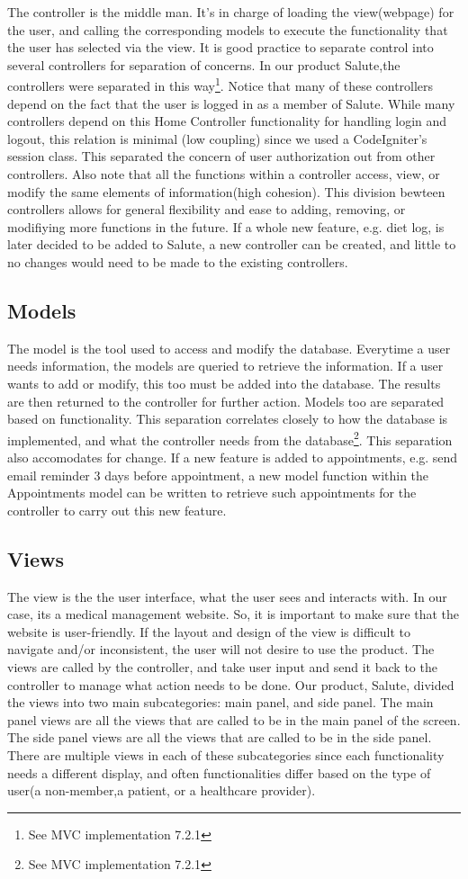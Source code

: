 \documentclass[12pt]{report}
\begin{document}
The controller is the middle man. It's in charge of loading the view(webpage) for the user, and calling the corresponding models to execute the functionality that the user has selected via the view. 
It is good practice to separate control into several controllers for separation of concerns. In our product Salute,the controllers were separated in this way\footnote{See MVC implementation 7.2.1}. Notice that many of these controllers depend on the fact that the user is logged in as a member of Salute. While many controllers depend on this Home Controller functionality for handling login and logout, this relation is minimal (low coupling) since we used a CodeIgniter's session class. This separated the concern of user authorization out from other controllers. 
Also note that all the functions within a controller access, view, or modify the same elements of information(high cohesion). This division bewteen controllers allows for general flexibility and ease to adding, removing, or modifiying more functions in the future. If a whole new feature, e.g. diet log, is later decided to be added to Salute, a new controller can be created, and little to no changes would need to be made to the existing controllers. 
\subsection{Models}
The model is the tool used to access and modify the database. Everytime a user needs information, the models are queried to retrieve the information. If a user wants to add or modify, this too must be added into the database. The results are then returned to the controller for further action.
Models too are separated based on functionality. This separation correlates closely to how the database is implemented, and what the controller needs from the database\footnote{See MVC implementation 7.2.1}. This separation also accomodates for change. If a new feature is added to appointments, e.g. send email reminder 3 days before appointment, a new model function within the Appointments model can be written to retrieve such appointments for the controller to carry out this new feature. 

\subsection{Views}
The view is the the user interface, what the user sees and interacts with. In our case, its a medical management website. So, it is important to make sure that the website is user-friendly. If the layout and design of the view is difficult to navigate and/or inconsistent, the user will not desire to use the product. The views are called by the controller, and take user input and send it back to the controller to manage what action needs to be done. 
Our product, Salute, divided the views into two main subcategories: main panel, and side panel. The main panel views are all the views that are called to be in the main panel of the screen. The side panel views are all the views that are called to be in the side panel. There are multiple views in each of these subcategories since each functionality needs a different display, and often functionalities differ based on the type of user(a non-member,a patient, or a healthcare provider). 
\end{document}
